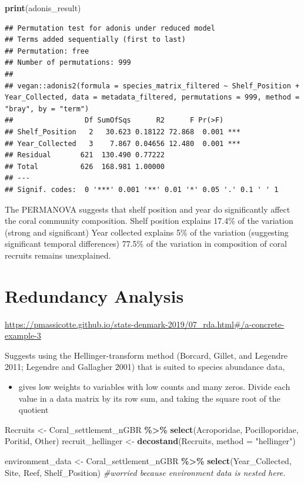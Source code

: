 \documentclass[
]{article}
\newenvironment{Shaded}{\begin{snugshade}}{\end{snugshade}}
\newcommand{\AttributeTok}[1]{\textcolor[rgb]{0.13,0.29,0.53}{#1}}
\newcommand{\CommentTok}[1]{\textcolor[rgb]{0.56,0.35,0.01}{\textit{#1}}}
\newcommand{\FunctionTok}[1]{\textcolor[rgb]{0.13,0.29,0.53}{\textbf{#1}}}
\newcommand{\NormalTok}[1]{#1}
\newcommand{\OtherTok}[1]{\textcolor[rgb]{0.56,0.35,0.01}{#1}}
\newcommand{\SpecialCharTok}[1]{\textcolor[rgb]{0.81,0.36,0.00}{\textbf{#1}}}
\newcommand{\StringTok}[1]{\textcolor[rgb]{0.31,0.60,0.02}{#1}}
\providecommand{\tightlist}{%
  \setlength{\itemsep}{0pt}\setlength{\parskip}{0pt}}
\begin{document}
\begin{Shaded}
\begin{Highlighting}[]
\FunctionTok{print}\NormalTok{(adonis\_result)}
\end{Highlighting}
\end{Shaded}

\begin{verbatim}
## Permutation test for adonis under reduced model
## Terms added sequentially (first to last)
## Permutation: free
## Number of permutations: 999
## 
## vegan::adonis2(formula = species_matrix_filtered ~ Shelf_Position + Year_Collected, data = metadata_filtered, permutations = 999, method = "bray", by = "term")
##                 Df SumOfSqs      R2      F Pr(>F)    
## Shelf_Position   2   30.623 0.18122 72.868  0.001 ***
## Year_Collected   3    7.867 0.04656 12.480  0.001 ***
## Residual       621  130.490 0.77222                  
## Total          626  168.981 1.00000                  
## ---
## Signif. codes:  0 '***' 0.001 '**' 0.01 '*' 0.05 '.' 0.1 ' ' 1
\end{verbatim}

The PERMANOVA suggests that shelf position and year do significantly
affect the coral community composition. Shelf position explains 17.4\%
of the variation (strong and significant) Year collected explains 5\% of
the variation (suggesting significant temporal differences) 77.5\% of
the variation in composition of coral recruits remains unexplained.

\section{Redundancy Analysis}\label{redundancy-analysis}

\url{https://pmassicotte.github.io/stats-denmark-2019/07_rda.html\#/a-concrete-example-3}

Suggests using the Hellinger-transform method (Borcard, Gillet, and
Legendre 2011; Legendre and Gallagher 2001) that is suited to species
abundance data,

\begin{itemize}
\tightlist
\item
  gives low weights to variables with low counts and many zeros. Divide
  each value in a data matrix by its row sum, and taking the square root
  of the quotient
\end{itemize}

\begin{Shaded}
\begin{Highlighting}[]
\NormalTok{Recruits }\OtherTok{\textless{}{-}}\NormalTok{ Coral\_settlement\_nGBR }\SpecialCharTok{\%\textgreater{}\%}
  \FunctionTok{select}\NormalTok{(Acroporidae, Pocilloporidae, Poritid, Other)}
\NormalTok{recruit\_hellinger }\OtherTok{\textless{}{-}} \FunctionTok{decostand}\NormalTok{(Recruits, }\AttributeTok{method =} \StringTok{"hellinger"}\NormalTok{)}

\NormalTok{environment\_data }\OtherTok{\textless{}{-}}\NormalTok{ Coral\_settlement\_nGBR }\SpecialCharTok{\%\textgreater{}\%}
  \FunctionTok{select}\NormalTok{(Year\_Collected, Site, Reef, Shelf\_Position) }\CommentTok{\#worried because environment data is nested here.}
\end{Highlighting}
\end{Shaded}
\end{document}
